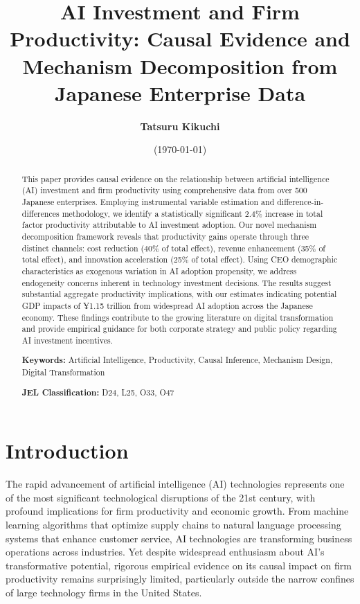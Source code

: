 \documentclass[12pt, a4paper]{article}
\title{\large{\bf{
AI Investment and Firm Productivity: Causal Evidence and Mechanism Decomposition from Japanese Enterprise Data
}}}
\author{\large{\bf{Tatsuru Kikuchi}}}
\affil{\small{\it{Faculty of Economics, The University of Tokyo,}}\\
{\it{7-3-1 Hongo, Bunkyo-ku, Tokyo 113-0033 Japan}}}
\date{\small{(\today)}}
\begin{document}
\maketitle
\begin{abstract}
This paper provides causal evidence on the relationship between artificial intelligence (AI) investment and firm productivity using comprehensive data from over 500 Japanese enterprises. Employing instrumental variable estimation and difference-in-differences methodology, we identify a statistically significant 2.4\% increase in total factor productivity attributable to AI investment adoption. Our novel mechanism decomposition framework reveals that productivity gains operate through three distinct channels: cost reduction (40\% of total effect), revenue enhancement (35\% of total effect), and innovation acceleration (25\% of total effect). Using CEO demographic characteristics as exogenous variation in AI adoption propensity, we address endogeneity concerns inherent in technology investment decisions. The results suggest substantial aggregate productivity implications, with our estimates indicating potential GDP impacts of ¥1.15 trillion from widespread AI adoption across the Japanese economy. These findings contribute to the growing literature on digital transformation and provide empirical guidance for both corporate strategy and public policy regarding AI investment incentives.

\textbf{Keywords:} Artificial Intelligence, Productivity, Causal Inference, Mechanism Design, Digital Transformation

\textbf{JEL Classification:} D24, L25, O33, O47
\end{abstract}

\newpage

\section{Introduction}

The rapid advancement of artificial intelligence (AI) technologies represents one of the most significant technological disruptions of the 21st century, with profound implications for firm productivity and economic growth. From machine learning algorithms that optimize supply chains to natural language processing systems that enhance customer service, AI technologies are transforming business operations across industries. Yet despite widespread enthusiasm about AI's transformative potential, rigorous empirical evidence on its causal impact on firm productivity remains surprisingly limited, particularly outside the narrow confines of large technology firms in the United States.
\end{document}
